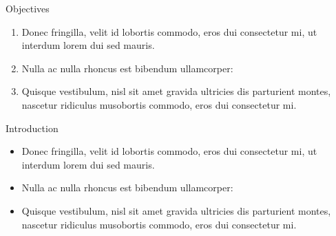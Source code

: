 
\begin{block}{Objectives}
	
	\begin{enumerate}
		\item Donec fringilla, velit id lobortis commodo, eros dui consectetur mi, ut interdum lorem dui sed mauris.
		\item Nulla ac nulla rhoncus est bibendum ullamcorper:
		\item Quisque vestibulum, nisl sit amet gravida ultricies dis parturient montes, nascetur ridiculus musobortis commodo, eros dui consectetur mi.
	\end{enumerate}
	
\end{block}


\begin{block}{Introduction}
	
	\begin{itemize}
		\item Donec fringilla, velit id lobortis commodo, eros dui consectetur mi, ut interdum lorem dui sed mauris.
		\item Nulla ac nulla rhoncus est bibendum ullamcorper:
		\item Quisque vestibulum, nisl sit amet gravida ultricies dis parturient montes, nascetur ridiculus musobortis commodo, eros dui consectetur mi.
	\end{itemize}
	
\end{block}


